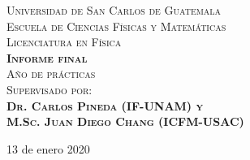 \documentclass[12pt]{report}
\begin{document}
\begin{titlepage}
\textsc{\Large Universidad de San Carlos de Guatemala\\
		Escuela de Ciencias Físicas y Matemáticas\\
		Licenciatura en Física}\\[2cm]

\textsc{{\Large\bfseries Informe final}}\\
\textsc{\large Año de prácticas}\\[2cm]

\textsc{\large Supervisado por:\\
		\textbf{Dr. Carlos Pineda (IF-UNAM) y\\
		M.Sc. Juan Diego Chang (ICFM-USAC)}}


\vfill\vfill\vfill %
\vfill\vfill\vfill

{\large 13 de enero 2020} %




\vfill %
\end{titlepage}
\end{document}
